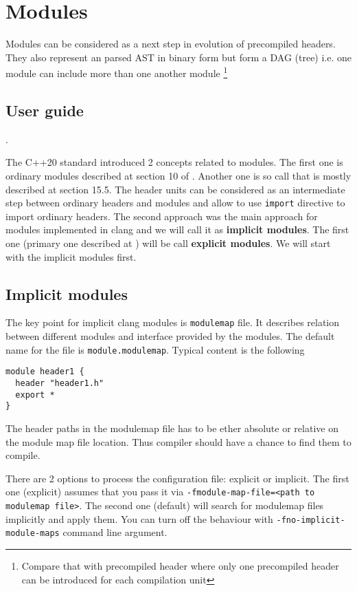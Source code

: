 \section{Modules}
Modules can be considered as a next step in evolution of precompiled
headers. They also represent an parsed AST in binary form but form a
DAG (tree) i.e. one module can include more than one another module
\footnote{Compare that with precompiled header where only one
precompiled header can be introduced for each compilation unit}
\subsection{User guide}.

The C++20 standard \cite{book:ieee_cpp_20} introduced 2 concepts
related to modules. The first one is ordinary modules described at
section 10 of \cite{book:ieee_cpp_20}. Another one is so call
 that is mostly described at section 15.5.
The header units can be considered as an intermediate step between
ordinary headers and modules and allow to use
\texttt{import} directive to import ordinary headers. The
second approach was the main approach for modules implemented in clang
and we will call it as \textbf{implicit modules}. The first one (primary one
described at \cite{book:ieee_cpp_20}) will be call \textbf{explicit
  modules}. We will start with the implicit modules first.

\subsection{Implicit modules}
The key point for implicit clang modules is \texttt{modulemap}
file. It describes relation between different modules and interface
provided by the modules. The default name for the file is
\texttt{module.modulemap}. Typical content is the following
\begin{verbatim}
module header1 {
  header "header1.h"
  export *
}
\end{verbatim}
The header paths in the modulemap file has to be ether absolute or
relative on the module map file location. Thus compiler should have a
chance to find them to compile.

There are 2 options to process the configuration file: explicit or
implicit. The first one (explicit) assumes that you pass it via
\texttt{-fmodule-map-file=<path to modulemap file>}. The
second one (default) will search for modulemap files implicitly and
apply them. You can turn off the behaviour with
\texttt{-fno-implicit-module-maps} command line argument.


